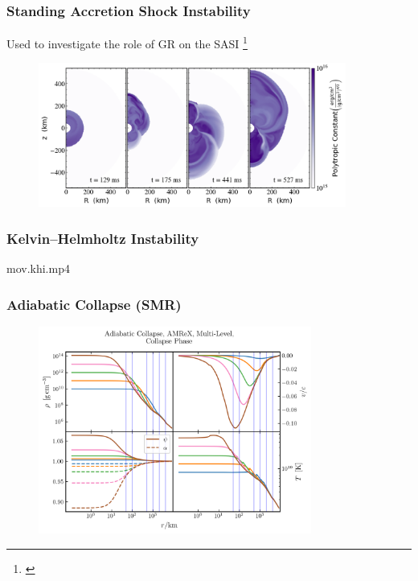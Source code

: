 \documentclass{beamer}
\begin{document}
\begin{frame}
\frametitle{Standing Accretion Shock Instability}

  Used \thornado{} to investigate the role of GR on the SASI%
  \footnote{\citet{dem2020,dem2023}}

  \begin{figure}[htb!]
    \centering
    \includegraphics[width=0.9\textwidth]{fig.sasi.png}
  \end{figure}

\end{frame}

\begin{frame}
\frametitle{Kelvin--Helmholtz Instability}

  \begin{center}
    {mov.khi.mp4}
  \end{center}

\end{frame}

\begin{frame}
\frametitle{Adiabatic Collapse (SMR)}

  \begin{figure}[htb!]
    \centering
    \includegraphics[width=0.8\textwidth]{fig.Collapse.png}
  \end{figure}

\end{frame}
\end{document}

